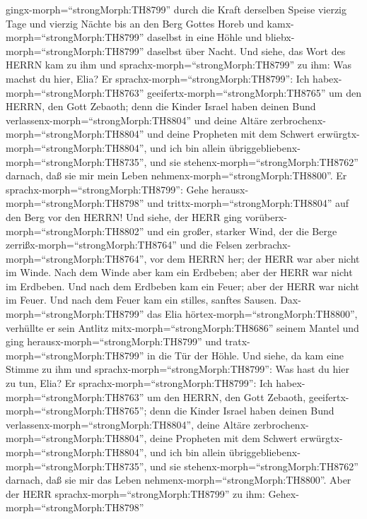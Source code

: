 gingx-morph=``strongMorph:TH8799'' durch die Kraft derselben Speise
vierzig Tage und vierzig Nächte bis an den Berg Gottes Horeb
 und kamx-morph=``strongMorph:TH8799'' daselbst in eine
Höhle und bliebx-morph=``strongMorph:TH8799'' daselbst über Nacht. Und
siehe, das Wort des HERRN kam zu ihm und
sprachx-morph=``strongMorph:TH8799'' zu ihm: Was machst du hier, Elia?
 Er sprachx-morph=``strongMorph:TH8799'': Ich
habex-morph=``strongMorph:TH8763''
geeifertx-morph=``strongMorph:TH8765'' um den HERRN, den Gott Zebaoth;
denn die Kinder Israel haben deinen Bund
verlassenx-morph=``strongMorph:TH8804'' und deine Altäre
zerbrochenx-morph=``strongMorph:TH8804'' und deine Propheten mit dem
Schwert erwürgtx-morph=``strongMorph:TH8804'', und ich bin allein
übriggebliebenx-morph=``strongMorph:TH8735'', und sie
stehenx-morph=``strongMorph:TH8762'' darnach, daß sie mir mein Leben
nehmenx-morph=``strongMorph:TH8800''.  Er
sprachx-morph=``strongMorph:TH8799'': Gehe
herausx-morph=``strongMorph:TH8798'' und
trittx-morph=``strongMorph:TH8804'' auf den Berg vor den HERRN! Und
siehe, der HERR ging vorüberx-morph=``strongMorph:TH8802'' und ein
großer, starker Wind, der die Berge zerrißx-morph=``strongMorph:TH8764''
und die Felsen zerbrachx-morph=``strongMorph:TH8764'', vor dem HERRN
her; der HERR war aber nicht im Winde. Nach dem Winde aber kam ein
Erdbeben; aber der HERR war nicht im Erdbeben.  Und nach
dem Erdbeben kam ein Feuer; aber der HERR war nicht im Feuer. Und nach
dem Feuer kam ein stilles, sanftes Sausen. 
Dax-morph=``strongMorph:TH8799'' das Elia
hörtex-morph=``strongMorph:TH8800'', verhüllte er sein Antlitz
mitx-morph=``strongMorph:TH8686'' seinem Mantel und ging
herausx-morph=``strongMorph:TH8799'' und
tratx-morph=``strongMorph:TH8799'' in die Tür der Höhle. Und siehe, da
kam eine Stimme zu ihm und sprachx-morph=``strongMorph:TH8799'': Was
hast du hier zu tun, Elia?  Er
sprachx-morph=``strongMorph:TH8799'': Ich
habex-morph=``strongMorph:TH8763'' um den HERRN, den Gott Zebaoth,
geeifertx-morph=``strongMorph:TH8765''; denn die Kinder Israel haben
deinen Bund verlassenx-morph=``strongMorph:TH8804'', deine Altäre
zerbrochenx-morph=``strongMorph:TH8804'', deine Propheten mit dem
Schwert erwürgtx-morph=``strongMorph:TH8804'', und ich bin allein
übriggebliebenx-morph=``strongMorph:TH8735'', und sie
stehenx-morph=``strongMorph:TH8762'' darnach, daß sie mir das Leben
nehmenx-morph=``strongMorph:TH8800''.  Aber der HERR
sprachx-morph=``strongMorph:TH8799'' zu ihm:
Gehex-morph=``strongMorph:TH8798''
